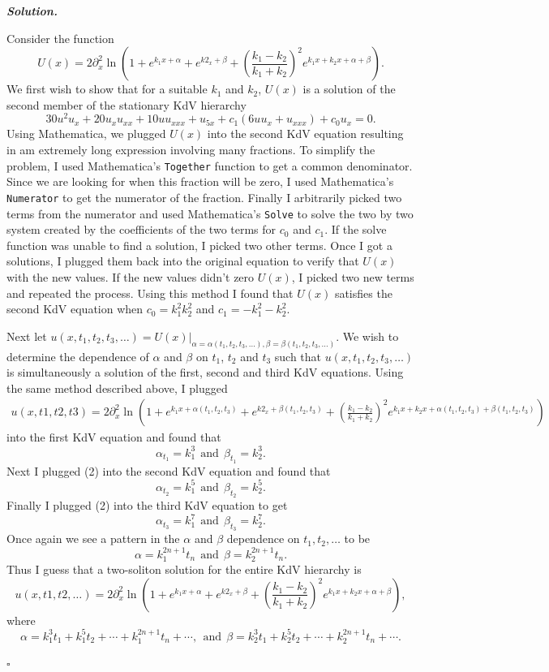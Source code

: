 \documentclass[12pt]{report}
\newenvironment{solution}[1][\it{Solution}]{\textbf{#1. } }{$\square$}
\begin{document}
\begin{solution}
    
    \noindent
    Consider the function
    \[ 
        U(x)=2\partial_x^2\ln\left(1+e^{k_1
x+\alpha}+e^{k2_x+\beta}+\left(\frac{k_1-k_2}{k_1+k_2}\right)^2
e^{k_1x+k_2 x+\alpha+\beta}\right).
    \]
    We first wish to show that for a suitable $k_1$ and $k_2$, $U(x)$ is a solution of the second member of the stationary KdV hierarchy
    \[ 
        30u^2u_x+20u_x u_{xx}+10u u_{xxx}+u_{5x}+c_1(6uu_x+u_{xxx})+c_0 u_x=0.
    \]
    Using Mathematica, we plugged $U(x)$ into the second KdV equation resulting in am extremely long expression involving many fractions. To simplify the problem, I used Mathematica's \verb+Together+ function to get a common denominator. Since we are looking for when this fraction will be zero, I used Mathematica's \verb+Numerator+ to get the numerator of the fraction. Finally I arbitrarily picked two terms from the numerator and used Mathematica's \verb+Solve+ to solve the two by two system created by the coefficients of the two terms for $c_0$ and $c_1$. If the solve function was unable to find a solution, I picked two other terms. Once I got a solutions, I plugged them back into the original equation to verify that $U(x)$ with the new values. If the new values didn't zero $U(x)$, I picked two new terms and repeated the process. Using this method I found that $U(x)$ satisfies the second KdV equation when $c_0 = k_1^2k_2^2$ and $c_1 = -k_1^2-k_2^2.$ 
    
    \noindent 
    Next let $u(x,t_1,t_2,t_3,\ldots)=U(x)|_{\alpha=\alpha(t_1,t_2,t_3,\ldots),
    \beta=\beta(t_1,t_2,t_3,\ldots)}$. We wish to determine
    the dependence of $\alpha$ and $\beta$ on $t_1$, $t_2$ and $t_3$ such that $u(x,t_1,t_2,t_3,\ldots)$ is simultaneously a solution of the first, second and third KdV equations. Using the same method described above, I plugged
    \begin{align}
        u(x,t1,t2,t3)=2\partial_x^2\ln\left(1+e^{k_1
x+\alpha(t_1,t_2,t_3)}+e^{k2_x+\beta(t_1,t_2,t_3)}+\left(\frac{k_1-k_2}{k_1+k_2}\right)^2
e^{k_1x+k_2 x+\alpha(t_1,t_2,t_3)+\beta(t_1,t_2,t_3)}\right)
    \end{align}
    into the first KdV equation and found that 
    \[ \alpha_{t_1} = k_1^3 ~~ \text{and} ~~ \beta_{t_1} = k_2^3.\]
    Next I plugged (2) into the second KdV equation and found that
    \[ \alpha_{t_2} = k_1^5 ~~ \text{and} ~~ \beta_{t_2} = k_2^5.\]
    Finally I plugged (2) into the third KdV equation to get
    \[ 
        \alpha_{t_3} = k_1^7 ~~ \text{and} ~~ \beta_{t_3} = k_2^7.
    \]  
    Once again we see a pattern in the $\alpha$ and $\beta$ dependence on $t_1,t_2,\ldots$ to be
    \[ 
        \alpha = k_1^{2n+1}t_n ~~ \text{and} ~~ \beta = k_2^{2n+1}t_n.
    \] 
    Thus I guess that a two-soliton solution for the entire KdV hierarchy is
    \[ 
        u(x,t1,t2,\ldots)=2\partial_x^2\ln\left(1+e^{k_1
x+\alpha}+e^{k2_x+\beta}+\left(\frac{k_1-k_2}{k_1+k_2}\right)^2
e^{k_1x+k_2 x+\alpha+\beta}\right),
    \]
    where 
    \[ \alpha = k_1^3t_1 + k_1^5t_2 + \cdots + k_1^{2n+1}t_n + \cdots, ~~\text{and}~~ \beta = k_2^3t_1 + k_2^5t_2 + \cdots + k_2^{2n+1}t_n + \cdots.\]


\end{solution}

\newpage
\end{document}
